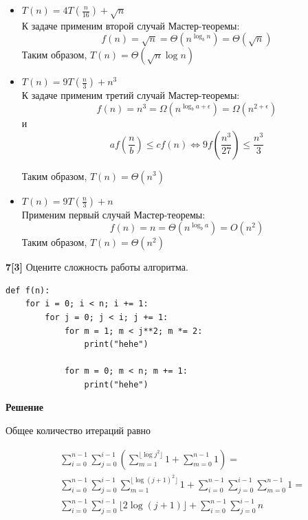 \documentclass{article}
\begin{document}
\begin{itemize}
          Таким образом, $T(n) = \Theta(n^3)$

    \item $T(n) = 4 T(\frac{n}{16}) + \sqrt{n}$ \\

          К задаче применим второй случай Мастер-теоремы:
          \[
              f(n) = \sqrt{n} = \Theta(n^{\log_{b} n}) = \Theta(\sqrt{n})
          \]
          Таким образом, $T(n) = \Theta(\sqrt{n} \log n)$

    \item $T(n) = 9 T(\frac{n}{3}) + n^3$ \\

          К задаче применим третий случай Мастер-теоремы:
          \[
              f(n) = n^3 = \Omega(n^{\log_{b} a + \epsilon}) =
              \Omega(n^{2 + \epsilon})
          \]
          и
          \[
              af(\frac{n}{b}) \leq cf(n) \Longleftrightarrow
              9f(\frac{n^3}{27}) \leq \frac{n^3}{3}
          \]

          Таким образом, $T(n) = \Theta(n^3)$

    \item $T(n) = 9 T(\frac{n}{3}) + n$ \\

          Применим первый случай Мастер-теоремы:
          \[
              f(n) = n = \Theta(n^{\log_{b} a}) = O(n^2)
          \]
          Таким образом, $T(n) = \Theta(n^2)$
\end{itemize}

\medskip

\textbf{7[3]} Оцените сложность работы алгоритма.

\begin{lstlisting}
def f(n):
    for i = 0; i < n; i += 1:
        for j = 0; j < i; j += 1:
            for m = 1; m < j**2; m *= 2:
                print("hehe")

            for m = 0; m < n; m += 1:
                print("hehe")
\end{lstlisting}

\medskip

\textbf{Решение}

Общее количество итераций равно

\begin{align*}
     & \sum_{i=0}^{n-1} \sum_{j=0}^{i-1}
    \left( \sum_{m=1}^{\lfloor \log j^2 \rfloor} 1 +
    \sum_{m=0}^{n - 1} 1 \right) =                           \\
     & \sum_{i=0}^{n-1} \sum_{j=0}^{i-1}
    \sum_{m=1}^{\lfloor \log{(j+1)^2} \rfloor} 1 +
    \sum_{i=0}^{n-1} \sum_{j=0}^{i-1} \sum_{m=0}^{n - 1} 1 = \\
     & \sum_{i=0}^{n-1} \sum_{j=0}^{i-1}
    \lfloor 2\log(j+1) \rfloor +
    \sum_{i=0}^{n-1} \sum_{j=0}^{i-1} n
\end{align*}
\end{document}
